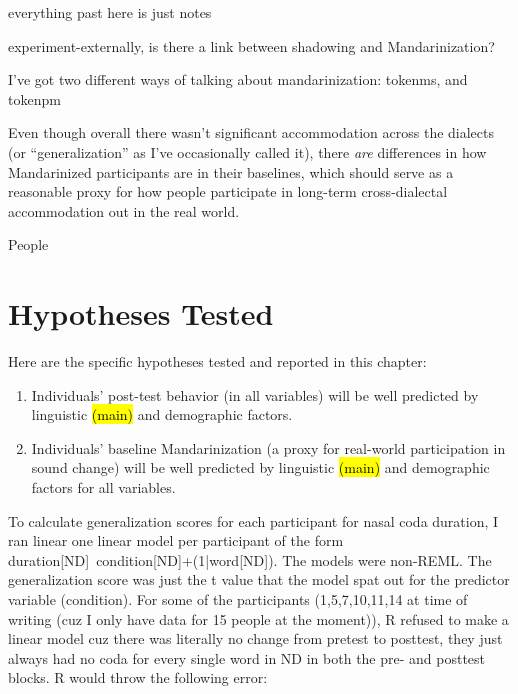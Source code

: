 \pagebreak
everything past here is just notes
\pagebreak

experiment-externally, is there a link between shadowing and Mandarinization?

I've got two different ways of talking about mandarinization: tokenms, and tokenpm

Even though overall there wasn't significant accommodation across the dialects (or ``generalization'' as I've occasionally called it), there \textit{are} differences in how Mandarinized participants are in their \ND{} baselines, which should serve as a reasonable proxy for how people participate in long-term cross-dialectal accommodation out in the real world.

People 

\section{Hypotheses Tested}
\label{sec:externalHypotheses}

Here are the specific hypotheses tested and reported in this chapter:

\begin{enumerate}
    \item Individuals' post-test behavior (in all variables) will be well predicted by linguistic \hl{(main)} and demographic factors.
    \item Individuals' baseline \ND{} Mandarinization (a proxy for real-world participation in sound change) will be well predicted by linguistic \hl{(main)} and demographic factors for all variables.
\end{enumerate}

To calculate generalization scores for each participant for nasal coda duration, I ran linear one linear model per participant of the form duration[ND]~condition[ND]+(1|word[ND]). %
The models were non-REML. The generalization score was just the t value that the model spat out for the predictor variable (condition). For some of the participants (1,5,7,10,11,14 at time of writing (cuz I only have data for 15 people at the moment)), R refused to make a linear model cuz there was literally no change from pretest to posttest, they just always had no coda for every single word in ND in both the pre- and posttest blocks. R would throw the following error:

